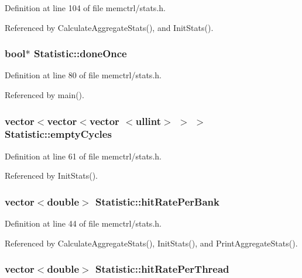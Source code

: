 Definition at line 104 of file memctrl/stats.h.

Referenced by CalculateAggregateStats(), and InitStats().
\subsubsection[{doneOnce}]{\setlength{\rightskip}{0pt plus 5cm}bool$\ast$ {\bf Statistic::doneOnce}}\label{classStatistic_a5e70d82e92e45d470aa0aad53b66101}




Definition at line 80 of file memctrl/stats.h.

Referenced by main().
\subsubsection[{emptyCycles}]{\setlength{\rightskip}{0pt plus 5cm}vector$<$vector$<$vector $<${\bf ullint}$>$ $>$ $>$ {\bf Statistic::emptyCycles}}\label{classStatistic_1d8bce84bd4bc20ec9856dfb733aef49}




Definition at line 61 of file memctrl/stats.h.

Referenced by InitStats().
\subsubsection[{hitRatePerBank}]{\setlength{\rightskip}{0pt plus 5cm}vector$<$double$>$ {\bf Statistic::hitRatePerBank}}\label{classStatistic_92bbfdc8f8dd9ba65c1295803bbd4fe8}




Definition at line 44 of file memctrl/stats.h.

Referenced by CalculateAggregateStats(), InitStats(), and PrintAggregateStats().
\subsubsection[{hitRatePerThread}]{\setlength{\rightskip}{0pt plus 5cm}vector$<$double$>$ {\bf Statistic::hitRatePerThread}}\label{classStatistic_d3f8b4f0f5c3cb24777b4e4d9d10a051}




